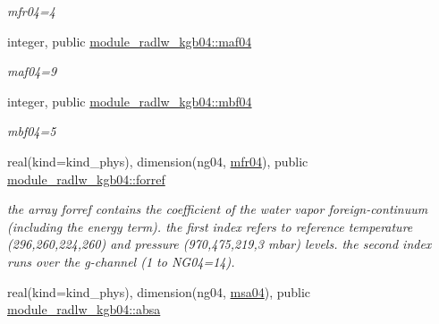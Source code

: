 \begin{DoxyCompactItemize}
\begin{DoxyCompactList}\small\item\em mfr04=4 \end{DoxyCompactList}\item 
\mbox{\label{group__module__radlw__kgbnn_ga60ff35def4e526c7d9cf3ec88bdd4485}} 
integer, public \hyperlink{group__module__radlw__kgbnn_ga60ff35def4e526c7d9cf3ec88bdd4485}{module\+\_\+radlw\+\_\+kgb04\+::maf04}
\begin{DoxyCompactList}\small\item\em maf04=9 \end{DoxyCompactList}\item 
\mbox{\label{group__module__radlw__kgbnn_ga768f4447809fb11206dce383a121d595}} 
integer, public \hyperlink{group__module__radlw__kgbnn_ga768f4447809fb11206dce383a121d595}{module\+\_\+radlw\+\_\+kgb04\+::mbf04}
\begin{DoxyCompactList}\small\item\em mbf04=5 \end{DoxyCompactList}\item 
\mbox{\label{group__module__radlw__kgbnn_ga816fd065291a92c13d026d38a708479b}} 
real(kind=kind\+\_\+phys), dimension(ng04, \hyperlink{group__module__radlw__kgbnn_gab6ae25b4a793bf78ccd504685d639039}{mfr04}), public \hyperlink{group__module__radlw__kgbnn_ga816fd065291a92c13d026d38a708479b}{module\+\_\+radlw\+\_\+kgb04\+::forref}
\begin{DoxyCompactList}\small\item\em the array forref contains the coefficient of the water vapor foreign-\/continuum (including the energy term). the first index refers to reference temperature (296,260,224,260) and pressure (970,475,219,3 mbar) levels. the second index runs over the g-\/channel (1 to N\+G04=14). \end{DoxyCompactList}\item 
\mbox{\label{group__module__radlw__kgbnn_ga8d73bb6971c872e15a24a81d3917167e}} 
real(kind=kind\+\_\+phys), dimension(ng04, \hyperlink{namespacemodule__radlw__kgb04_ac8c5caff005fd04d01009dd9e977d570}{msa04}), public \hyperlink{group__module__radlw__kgbnn_ga8d73bb6971c872e15a24a81d3917167e}{module\+\_\+radlw\+\_\+kgb04\+::absa}

\end{DoxyCompactItemize}
